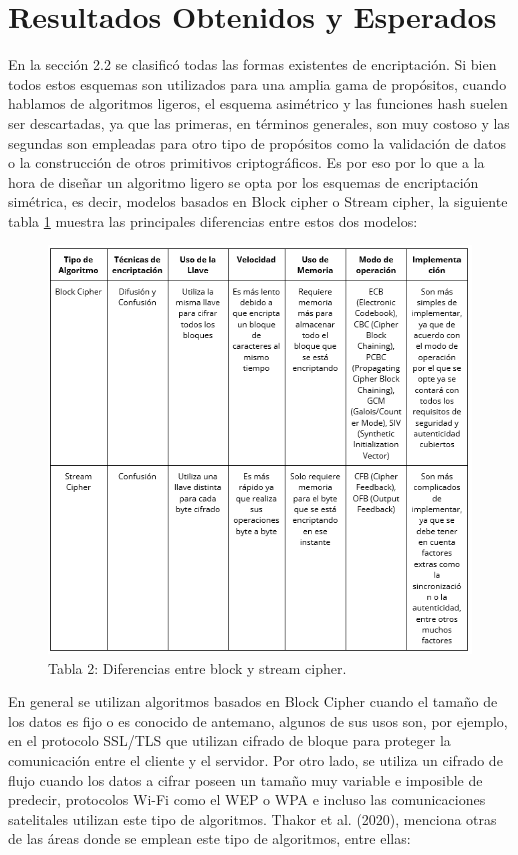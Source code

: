 \documentclass[a4paper,10pt]{article}
\begin{document}
	\section{Resultados Obtenidos y Esperados}
	En la sección 2.2 se clasificó todas las formas existentes de encriptación. Si bien todos estos esquemas son utilizados para una amplia gama de propósitos, cuando hablamos de algoritmos ligeros, el esquema asimétrico y las funciones hash suelen ser descartadas, ya que las primeras, en términos generales, son muy costoso y las segundas son empleadas para otro tipo de propósitos como la validación de datos o la construcción de otros primitivos criptográficos. Es por eso por lo que a la hora de diseñar un algoritmo ligero se opta por los esquemas de encriptación simétrica, es decir, modelos basados en Block cipher o Stream cipher, la siguiente tabla \ref{Diferencias_Block_Stream_Cipher} muestra las principales diferencias entre estos dos modelos:
	\begin{figure}[h]
		\centering
		\includegraphics[width=1.0\textwidth]{tablaBlockStreamCipher.PNG}
		\caption{Tabla 2: Diferencias entre block y stream cipher.}
		\label{Diferencias_Block_Stream_Cipher}
	\end{figure}
	En general se utilizan algoritmos basados en Block Cipher cuando el tamaño de los datos es fijo o es conocido de antemano, algunos de sus usos son, por ejemplo, en el protocolo SSL/TLS que utilizan cifrado de bloque para proteger la comunicación entre el cliente y el servidor. Por otro lado, se utiliza un cifrado de flujo cuando los datos a cifrar poseen un tamaño muy variable e imposible de predecir, protocolos Wi-Fi como el WEP o WPA e incluso las comunicaciones satelitales utilizan este tipo de algoritmos. Thakor et al. (2020), menciona otras de las áreas donde se emplean este tipo de algoritmos, entre ellas:
\end{document}
